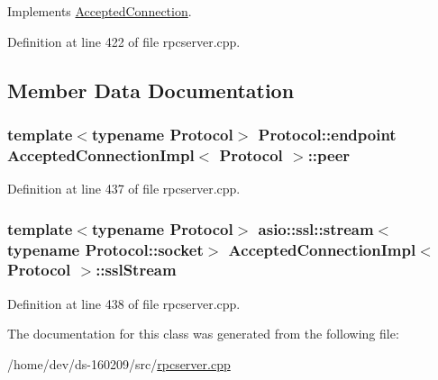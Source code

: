 Implements \hyperlink{class_accepted_connection_a2072a12e4d8f1b79a67bc86903400a0e}{Accepted\+Connection}.



Definition at line 422 of file rpcserver.\+cpp.



\subsection{Member Data Documentation}
\hypertarget{class_accepted_connection_impl_ade939b7d2778690cf78a9f6719f47c76}{}
\subsubsection[{peer}]{\setlength{\rightskip}{0pt plus 5cm}template$<$typename Protocol$>$ Protocol\+::endpoint {\bf Accepted\+Connection\+Impl}$<$ Protocol $>$\+::peer}\label{class_accepted_connection_impl_ade939b7d2778690cf78a9f6719f47c76}


Definition at line 437 of file rpcserver.\+cpp.

\hypertarget{class_accepted_connection_impl_afcfc99c020d301985bc19b4075fc7e78}{}
\subsubsection[{ssl\+Stream}]{\setlength{\rightskip}{0pt plus 5cm}template$<$typename Protocol$>$ asio\+::ssl\+::stream$<$typename Protocol\+::socket$>$ {\bf Accepted\+Connection\+Impl}$<$ Protocol $>$\+::ssl\+Stream}\label{class_accepted_connection_impl_afcfc99c020d301985bc19b4075fc7e78}


Definition at line 438 of file rpcserver.\+cpp.



The documentation for this class was generated from the following file\+:\begin{DoxyCompactItemize}
\item 
/home/dev/ds-\/160209/src/\hyperlink{rpcserver_8cpp}{rpcserver.\+cpp}\end{DoxyCompactItemize}

